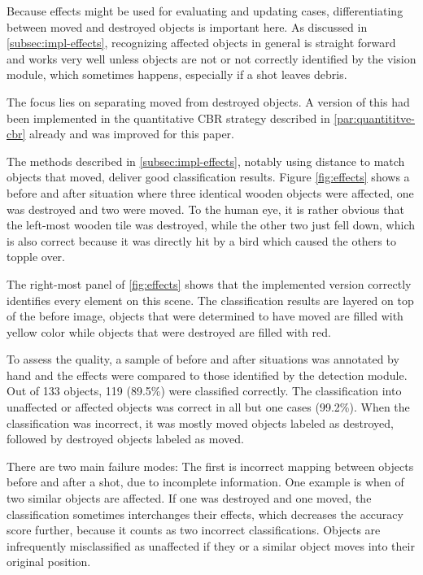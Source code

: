 Because effects might be used for evaluating and updating cases, differentiating between moved and destroyed objects is important here.
As discussed in \ref{subsec:impl-effects}, recognizing affected objects in general is straight forward and works very well unless objects are not or not correctly identified by the vision module, which sometimes happens, especially if a shot leaves debris.

The focus lies on separating moved from destroyed objects.
A version of this had been implemented in the quantitative \ac{CBR} strategy described in \ref{par:quantititve-cbr} already and was improved for this paper.

The methods described in \ref{subsec:impl-effects}, notably using distance to match objects that moved, deliver good classification results. Figure \ref{fig:effects} shows a before and after situation where three identical wooden objects were affected, one was destroyed and two were moved.
To the human eye, it is rather obvious that the left-most wooden tile was destroyed, while the other two just fell down, which is also correct because it was directly hit by a bird which caused the others to topple over.

The right-most panel of \ref{fig:effects} shows that the implemented version correctly identifies every element on this scene.
The classification results are layered on top of the before image, objects that were determined to have moved are filled with yellow color while objects that were destroyed are filled with red.

To assess the quality, a sample of before and after situations was annotated by hand and the effects were compared to those identified by the detection module. Out of 133 objects, 119 (89.5\%) were classified correctly. The classification into unaffected or affected objects was correct in all but one cases (99.2\%).
When the classification was incorrect, it was mostly moved objects labeled as destroyed, followed by destroyed objects labeled as moved.

There are two main failure modes: The first is incorrect mapping between objects before and after a shot, due to incomplete information. One example is when of two similar objects are affected. If one was destroyed and one moved, the classification sometimes interchanges their effects, which decreases the accuracy score further, because it counts as two incorrect classifications.
Objects are infrequently misclassified as unaffected if they or a similar object moves into their original position.

